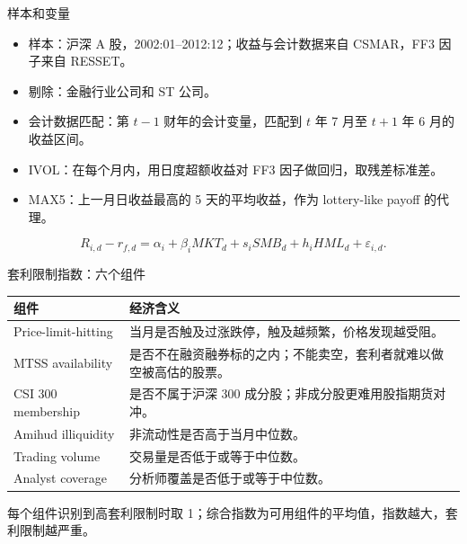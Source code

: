 \documentclass[aspectratio=169,10pt]{beamer}
\newcommand{\tighttable}{\scriptsize\setlength{\tabcolsep}{3pt}\renewcommand{\arraystretch}{1.12}}
\begin{document}
\begin{frame}{样本和变量}
	\begin{itemize}
		\item 样本：沪深 A 股，2002:01--2012:12；收益与会计数据来自 CSMAR，FF3 因子来自 RESSET。
		\item 剔除：金融行业公司和 ST 公司。
		\item 会计数据匹配：第 $t-1$ 财年的会计变量，匹配到 $t$ 年 7 月至 $t+1$ 年 6 月的收益区间。
		\item IVOL：在每个月内，用日度超额收益对 FF3 因子做回归，取残差标准差。
		\item MAX5：上一月日收益最高的 5 天的平均收益，作为 lottery-like payoff 的代理。
	\end{itemize}
	\[
	R_{i,d}-r_{f,d}=\alpha_i+\beta_i MKT_d+s_i SMB_d+h_i HML_d+\varepsilon_{i,d}.
	\]
\end{frame}

\begin{frame}{套利限制指数：六个组件}
	\tighttable
	\begin{tabularx}{\textwidth}{lY}
		\toprule
		组件 & 经济含义 \\
		\midrule
		Price-limit-hitting & 当月是否触及过涨跌停，触及越频繁，价格发现越受阻。\\
		MTSS availability & 是否不在融资融券标的之内；不能卖空，套利者就难以做空被高估的股票。\\
		CSI 300 membership & 是否不属于沪深 300 成分股；非成分股更难用股指期货对冲。\\
		Amihud illiquidity & 非流动性是否高于当月中位数。\\
		Trading volume & 交易量是否低于或等于中位数。\\
		Analyst coverage & 分析师覆盖是否低于或等于中位数。\\
		\bottomrule
	\end{tabularx}
	\par\vspace{5pt}
	\small 每个组件识别到高套利限制时取 1；综合指数为可用组件的平均值，指数越大，套利限制越严重。
\end{frame}
\end{document}
